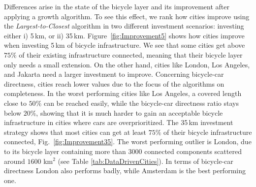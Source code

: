 Differences arise in the state of the bicycle layer and its improvement after applying a growth algorithm. To see this effect, we rank how cities improve using the \textit{Largest-to-Closest} algorithm in two different investment scenarios: investing either i) 5\,km, or ii) 35\,km. Figure~\ref{fig:Improvement5} shows how cities improve when investing 5\,km of bicycle infrastructure. We see that some cities get above $75\%$ of their existing infrastructure connected, meaning that their bicycle layer only needs a small extension. On the other hand, cities like London, Los Angeles, and Jakarta need a larger investment to improve. Concerning bicycle-car directness, cities reach lower values due to the focus of the algorithms on completeness. In the worst performing cities like Los Angeles, a covered length close to $50\%$ can be reached easily, while the bicycle-car directness ratio stays below $20\%$, showing that it is much harder to gain an acceptable bicycle infrastructure in cities where cars are overprioritized. The 35\,km investment strategy shows that most cities can get at least $75\%$ of their bicycle infrastructure connected, Fig.~\ref{fig:Improvement35}. The worst performing outlier is London, due to its bicycle layer containing more than 3000 connected components scattered around $1600$ km$^2$ (see Table \ref{tab:DataDrivenCities}). In terms of bicycle-car directness London also performs badly, while Amsterdam is the best performing one.

